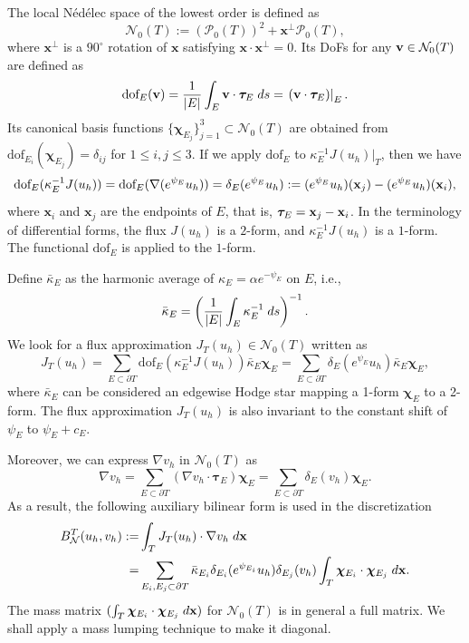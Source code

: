 \documentclass[a4paper]{article}
\theoremstyle{plain}
\theoremstyle{definition}
\numberwithin{equation}{section}
\newcommand{\bx}{{\bf x}}
\newcommand{\bv}{{\bf v}}
\begin{document}
The local N\'ed\'elec space of the lowest order is defined as
\begin{equation*}
\mathcal{N}_0(T):=(\mathcal{P}_0(T))^2+\mathbf{x}^\perp\mathcal{P}_0(T),
\end{equation*}
where $\mathbf{x}^\perp$ is a $90^{\circ}$ rotation of $\mathbf{x}$ satisfying $\mathbf{x}\cdot\mathbf{x}^\perp=0$.
Its DoFs for any $\bv\in \mathcal{N}_0(T)$ are defined as
\begin{equation*}
\text{dof}_E(\mathbf{v})=\frac{1}{|E|}\int_E\mathbf{v}\cdot\bm{\tau}_E\;{\rm d}s=\left.(\mathbf{v}\cdot\bm{\tau}_E)\right|_E.
\end{equation*}
Its canonical basis functions $\{\bm{\chi}_{E_j}\}_{j=1}^3\subset \mathcal{N}_0(T)$ are obtained from $\text{dof}_{E_i}(\bm{\chi}_{E_j})=\delta_{ij}$ for $1\leq i,j\leq 3$.
If we apply $\text{dof}_E$ to $\kappa_E^{-1}J(u_h)|_T$, then we have
\begin{equation}
\text{dof}_{E}(\kappa_E^{-1}J(u_h))=\text{dof}_{E}(\nabla(e^{\psi_E} u_h))=\delta_{E}(e^{\psi_E} u_h):=(e^{\psi_E} u_h)(\bx_j)-(e^{\psi_E} u_h)(\bx_i),
\label{def delta}
\end{equation}
where $\mathbf{x}_i$ and $\mathbf{x}_j$ are the endpoints of $E$, that is, $\bm{\tau}_E=\bx_j-\bx_i$.
In the terminology of differential forms, the flux $J(u_h)$ is a $2$-form, and $\kappa_E^{-1}J(u_h)$ is a $1$-form. The functional $\text{dof}_E$ is applied to the $1$-form.

Define $\bar{\kappa}_E$ as the harmonic average of $\kappa_E=\alpha e^{-\psi_E}$ on $E$, i.e.,
\begin{equation}
\bar{\kappa}_E=\left(\frac{1}{|E|}\int_{E}\kappa_E^{-1}\;{\rm d}s\right)^{-1}.\label{harmonic average}
\end{equation}
We look for a flux approximation $J_T(u_h)\in \mathcal{N}_0(T)$ written as
\begin{equation*}
J_T (u_h)= \sum_{E\subset \partial T}\text{dof}_{E}(\kappa_E^{-1}J(u_h)) \bar{\kappa}_{E}\bm{\chi}_E=\sum_{E\subset \partial T}\delta_{E}(e^{\psi_E} u_h)\bar{\kappa}_{E}\bm{\chi}_E,
\end{equation*}
where $\bar{\kappa}_E$ can be considered an edgewise Hodge star mapping a 1-form $\bm{\chi}_E$ to a 2-form.
The flux approximation $J_T(u_h)$ is also invariant to the constant shift of $\psi_E$ to $\psi_E+c_E$.

Moreover, we can express $\nabla v_h$ in $\mathcal N_0(T)$ as 
$$
\nabla v_h=\sum_{E\subset \partial T} (\nabla v_h\cdot\bm{\tau}_E) \bm{\chi}_E = \sum_{E\subset \partial T}\delta_{E}(v_h)\bm{\chi}_E.
$$
As a result, the following auxiliary bilinear form is used in the discretization
\begin{align}
B^{T}_\mathcal{N}(u_h,v_h):=&\int_T J_T(u_h)\cdot\nabla v_h\;{\rm d}\mathbf{x}\nonumber\\
=&\sum_{E_i,E_j\subset \partial T}\bar{\kappa}_{E_i}\delta_{E_i}(e^{\psi_{E_i}} u_h)\delta_{E_j}(v_h) \int_T\bm{\chi}_{E_i}\cdot \bm{\chi}_{E_j}\;{\rm d}\mathbf{x}. \label{inter bilinear form}
\end{align}
The mass matrix $(\int_T\bm{\chi}_{E_i}\cdot \bm{\chi}_{E_j}\;{\rm d}\mathbf{x})$ for $\mathcal N_0(T)$ is in general a full matrix. We shall apply a mass lumping technique to make it diagonal.
 
\end{document}
